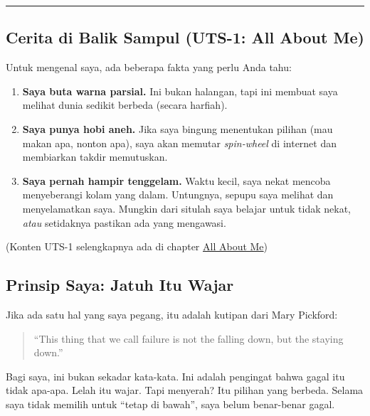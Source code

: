 \documentclass[
  letterpaper,
  DIV=11,
  numbers=noendperiod]{scrreprt}
\providecommand{\tightlist}{%
  \setlength{\itemsep}{0pt}\setlength{\parskip}{0pt}}
\begin{document}
\begin{center}\rule{0.5\linewidth}{0.5pt}\end{center}

\subsection*{Cerita di Balik Sampul (UTS-1: All About
Me)}\label{cerita-di-balik-sampul-uts-1-all-about-me}

Untuk mengenal saya, ada beberapa fakta yang perlu Anda tahu:

\begin{enumerate}
\def\labelenumi{\arabic{enumi}.}
\tightlist
\item
  \textbf{Saya buta warna parsial.} Ini bukan halangan, tapi ini membuat
  saya melihat dunia sedikit berbeda (secara harfiah).
\item
  \textbf{Saya punya hobi aneh.} Jika saya bingung menentukan pilihan
  (mau makan apa, nonton apa), saya akan memutar \emph{spin-wheel} di
  internet dan membiarkan takdir memutuskan.
\item
  \textbf{Saya pernah hampir tenggelam.} Waktu kecil, saya nekat mencoba
  menyeberangi kolam yang dalam. Untungnya, sepupu saya melihat dan
  menyelamatkan saya. Mungkin dari situlah saya belajar untuk tidak
  nekat, \emph{atau} setidaknya pastikan ada yang mengawasi.
\end{enumerate}

(Konten UTS-1 selengkapnya ada di chapter
\href{./All_About_me/index.qmd}{All About Me})

\subsection*{Prinsip Saya: Jatuh Itu
Wajar}\label{prinsip-saya-jatuh-itu-wajar}

Jika ada satu hal yang saya pegang, itu adalah kutipan dari Mary
Pickford:

\begin{quote}
``This thing that we call failure is not the falling down, but the
staying down.''
\end{quote}

Bagi saya, ini bukan sekadar kata-kata. Ini adalah pengingat bahwa gagal
itu tidak apa-apa. Lelah itu wajar. Tapi menyerah? Itu pilihan yang
berbeda. Selama saya tidak memilih untuk ``tetap di bawah'', saya belum
benar-benar gagal.
\end{document}
